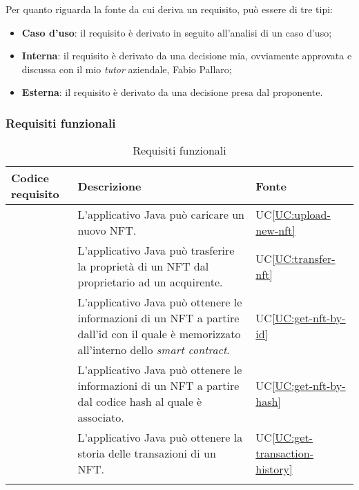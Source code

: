\noindent Per quanto riguarda la fonte da cui deriva un requisito, può essere di tre tipi:
\begin{itemize}
  \item \textbf{Caso d'uso}: il requisito è derivato in seguito all'analisi di un caso d'uso;
  \item \textbf{Interna}: il requisito è derivato da una decisione mia, ovviamente approvata e discussa con il mio \textit{tutor} aziendale, Fabio Pallaro;
  \item \textbf{Esterna}: il requisito è derivato da una decisione presa dal proponente. 
\end{itemize}

\subsubsection{Requisiti funzionali}
\begin{longtabu}{|X[0.8,c]|X[3,c]|X[0.5,c]|}
  \hline 

  \textbf{Codice requisito} & \textbf{Descrizione} & \textbf{Fonte} \\ 

  \hline

   \label{rfun:upload-new-nft} & L'applicativo Java può caricare un nuovo NFT. & UC\ref{UC:upload-new-nft} \\
  
  \hline

   \label{rfun:transfer-nft} & L'applicativo Java può trasferire la proprietà di un NFT dal proprietario ad un acquirente. & UC\ref{UC:transfer-nft} \\ 
  
  \hline

   \label{rfun:get-nft-by-id} & L'applicativo Java può ottenere le informazioni di un NFT a partire dall'id con il quale è memorizzato all'interno dello \textit{smart contract}. & UC\ref{UC:get-nft-by-id} \\ 
  
  \hline

   \label{rfun:get-nft-by-hash} & L'applicativo Java può ottenere le informazioni di un NFT a partire dal codice hash al quale è associato. & UC\ref{UC:get-nft-by-hash} \\ 
  
  \hline

   \label{rfun:get-transaction-history}  & L'applicativo Java può ottenere la storia delle transazioni di un NFT. & UC\ref{UC:get-transaction-history} \\ 
  
  \hline

  \caption{Requisiti funzionali}
\end{longtabu}

